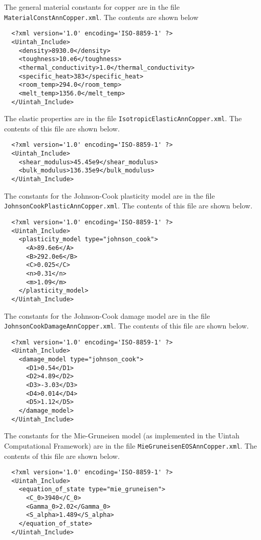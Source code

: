 \documentclass[10pt]{article}
\begin{document}
  The general material constants for copper are in the file 
  \verb+MaterialConstAnnCopper.xml+.  The contents are shown below
  \begin{verbatim}
  <?xml version='1.0' encoding='ISO-8859-1' ?>
  <Uintah_Include>
    <density>8930.0</density>
    <toughness>10.e6</toughness>
    <thermal_conductivity>1.0</thermal_conductivity>
    <specific_heat>383</specific_heat>
    <room_temp>294.0</room_temp>
    <melt_temp>1356.0</melt_temp>
  </Uintah_Include>
  \end{verbatim}

  The elastic properties are in the file \verb+IsotropicElasticAnnCopper.xml+.
  The contents of this file are shown below.
  \begin{verbatim}
  <?xml version='1.0' encoding='ISO-8859-1' ?>
  <Uintah_Include>
    <shear_modulus>45.45e9</shear_modulus>
    <bulk_modulus>136.35e9</bulk_modulus>
  </Uintah_Include>
  \end{verbatim}
  
  The constants for the Johnson-Cook plasticity model are in the file
  \verb+JohnsonCookPlasticAnnCopper.xml+.  The contents of this file are
  shown below.
  \begin{verbatim}
  <?xml version='1.0' encoding='ISO-8859-1' ?>
  <Uintah_Include>
    <plasticity_model type="johnson_cook">
      <A>89.6e6</A>
      <B>292.0e6</B>
      <C>0.025</C>
      <n>0.31</n>
      <m>1.09</m>
    </plasticity_model>
  </Uintah_Include>
  \end{verbatim}

  The constants for the Johnson-Cook damage model are in the file
  \verb+JohnsonCookDamageAnnCopper.xml+.  The contents of this file are
  shown below.
  \begin{verbatim}
  <?xml version='1.0' encoding='ISO-8859-1' ?>
  <Uintah_Include>
    <damage_model type="johnson_cook">
      <D1>0.54</D1>
      <D2>4.89</D2>
      <D3>-3.03</D3>
      <D4>0.014</D4>
      <D5>1.12</D5>
    </damage_model>
  </Uintah_Include>
  \end{verbatim}

  The constants for the Mie-Gruneisen model (as implemented in the 
  Uintah Computational Framework) are in the file
  \verb+MieGruneisenEOSAnnCopper.xml+.  The contents of this file are
  shown below.
  \begin{verbatim}
  <?xml version='1.0' encoding='ISO-8859-1' ?>
  <Uintah_Include>
    <equation_of_state type="mie_gruneisen">
      <C_0>3940</C_0>
      <Gamma_0>2.02</Gamma_0>
      <S_alpha>1.489</S_alpha>
    </equation_of_state>
  </Uintah_Include>
  \end{verbatim}
\end{document}
